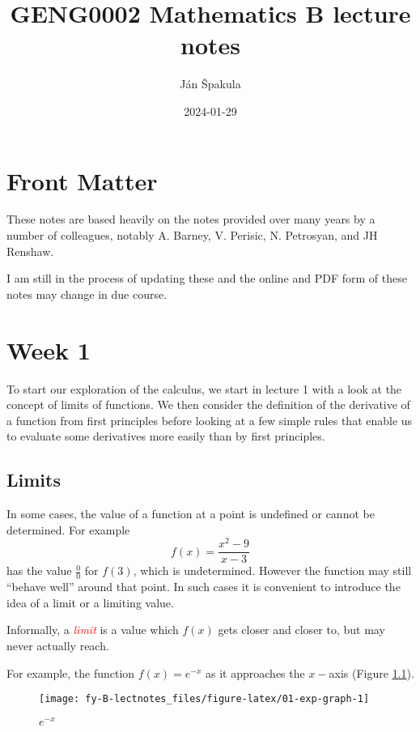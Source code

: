\documentclass[
  11pt,
  oneside]{book}
\title{GENG0002 Mathematics B lecture notes}
\author{Ján Špakula}
\date{2024-01-29}
\newcommand{\slide}{}
\theoremstyle{definition}
\theoremstyle{definition}
\theoremstyle{definition}
\theoremstyle{definition}
\theoremstyle{remark}
\begin{document}
\maketitle

{
\setcounter{tocdepth}{1}
\tableofcontents
}
\chapter*{Front Matter}\label{front-matter}

These notes are based heavily on the notes provided over many years by a number of colleagues, notably A. Barney, V. Perisic, N. Petrosyan, and JH Renshaw.

I am still in the process of updating these and the online and PDF form of these notes may change in due course.

\chapter{Week 1}\label{week-one}

To start our exploration of the calculus, we start in lecture 1 with a look at the concept of limits of functions. We then consider the definition of the derivative of a function from first principles before looking at a few simple rules that enable us to evaluate some derivatives more easily than by first principles.
\slide

\section{Limits}\label{lecture-one}

In some cases, the value of a function at a point is undefined or cannot be determined. For example
\[
f(x) = \frac{x^2-9}{x-3}\tag{1}
\]
has the value \(\frac00\) for \(f(3)\), which is undetermined. However the function may still ``behave well'' around that point. In such cases it is convenient to introduce the idea of a limit or a limiting value.

Informally, a \textcolor{red}{\em limit} is a value which \(f(x)\) gets closer and closer to, but may never actually reach.

\slide

For example, the function \(f(x) = e^{-x}\) as it approaches the \(x-\)axis (Figure \ref{fig:01-exp-graph}).

\begin{figure}

{\centering \texttt{[image: fy-B-lectnotes\_files/figure-latex/01-exp-graph-1]} 

}

\caption{$e^{-x}$}\label{fig:01-exp-graph}
\end{figure}
\end{document}
